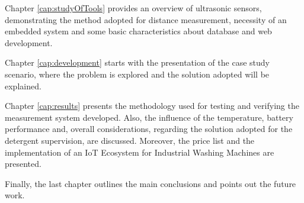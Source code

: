 Chapter \ref{cap:studyOfTools} provides an overview of ultrasonic sensors, demonstrating the method adopted for distance measurement, necessity of an embedded system and some basic characteristics about database and web development.

Chapter \ref{cap:development} starts with the presentation of the case study scenario, where the problem is explored and the solution adopted will be explained.

Chapter \ref{cap:results} presents the methodology used for testing and verifying the measurement system developed. Also, the influence of the temperature, battery performance and, overall considerations, regarding the solution adopted for the detergent supervision, are discussed. Moreover, the price list and the implementation of an \gls{IoT} Ecosystem for Industrial Washing Machines are presented.

Finally, the last chapter outlines the main conclusions and points out the future work.

